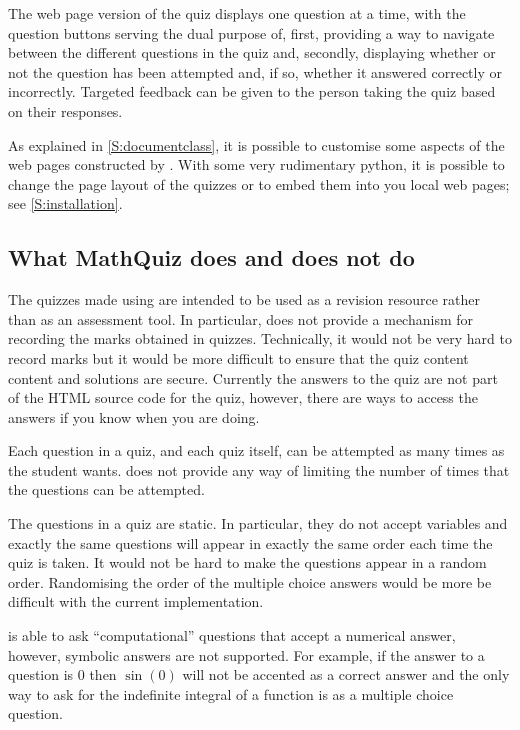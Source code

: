 \documentclass[svgnames]{article}
\begin{document}
    The web page version of the quiz displays one question at a time,
    with the question buttons serving the dual purpose of, first,
    providing a way to navigate between the different questions in the
    quiz and, secondly, displaying whether or not the question has been
    attempted and, if so, whether it answered correctly or incorrectly.
    Targeted feedback can be given to the person taking the quiz based
    on their responses.

    As explained in \autoref{S:documentclass}, it is possible to
    customise some aspects of the web pages constructed by \MathQuiz.
    With some very rudimentary python, it is possible to change the page
    layout of the quizzes or to embed them into you local web pages; see
    \autoref{S:installation}.

\subsection{What MathQuiz does and does not do}

    The quizzes made using \MathQuiz are intended to be used as a
    revision resource rather than as an assessment tool. In particular,
    \MathQuiz does not provide a mechanism for recording the marks
    obtained in quizzes. Technically, it would not be very hard to record marks
    but it would be more difficult to ensure that the quiz content
    content and solutions are secure. Currently the answers to the quiz
    are not part of the HTML source code for the quiz, however, there
    are ways to access the answers if you know when you are doing.

    Each question in a quiz, and each quiz itself, can be attempted as
    many times as the student wants. \MathQuiz does not provide any way
    of limiting the number of times that the questions can be attempted.

    The questions in a \MathQuiz quiz are static. In particular, they do
    not accept variables and exactly the same questions will appear in
    exactly the same order each time the quiz is taken. It would not be
    hard to make the questions appear in a random order. Randomising the
    order of the multiple choice answers would be more be difficult with
    the current implementation.

    \MathQuiz is able to ask ``computational'' questions that accept a
    numerical answer, however, symbolic answers are not supported.
    For example, if the answer to a question is $0$ then $\sin(0)$ will
    not be accented as a correct answer and the only way to ask for the
    indefinite integral of a function is as a multiple choice question.
\end{document}
